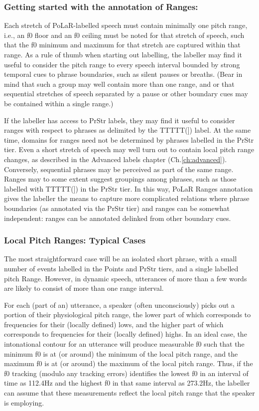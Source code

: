 \documentclass[11pt, twoside]{memoir}
\begin{document}
\subsubsection{Getting started with the annotation of Ranges:}\label{sec:getting-started-with-the-annotation-of-ranges}

Each stretch of PoLaR-labelled speech must contain minimally one pitch range, i.e., an f0 floor and an f0 ceiling must be noted for that stretch of speech, such that the f0 minimum and maximum for that stretch are captured within that range. As a rule of thumb when starting out labelling, the labeller may find it useful to consider the pitch range to every speech interval bounded by strong temporal cues to phrase boundaries, such as silent pauses or breaths. (Bear in mind that such a group may well contain more than one range, and or that sequential stretches of speech separated by a pause or other boundary cues may be contained within a single range.)

If the labeller has access to PrStr labels, they may find it useful to consider ranges with respect to phrases as delimited by the TTTTT(]) label. At the same time, domains for ranges need not be determined by phrases labelled in the PrStr tier. Even a short stretch of speech may well turn out to contain local pitch range changes, as described in the Advanced labels chapter (Ch.\ref{ch:advanced}). Conversely, sequential phrases may be perceived as part of the same range. Ranges may to some extent suggest groupings among phrases, such as those labelled with TTTTT(]) in the PrStr tier. In this way, PoLaR Ranges annotation gives the labeller the means to capture more complicated relations where phrase boundaries (as annotated via the PrStr tier) and ranges can be somewhat independent: ranges can be annotated delinked from other boundary cues.

\subsubsection{Local Pitch Ranges: Typical Cases}\label{sec:local-pitch-ranges-typical-cases}

The most straightforward case will be an isolated short phrase, with a small number of events labelled in the Points and PrStr tiers, and a single labelled pitch Range. However, in dynamic speech, utterances of more than a few words are likely to consist of more than one range interval.

For each (part of an) utterance, a speaker (often unconsciously) picks out a portion of their physiological pitch range, the lower part of which corresponds to frequencies for their (locally defined) lows, and the higher part of which corresponds to frequencies for their (locally defined) highs. In an ideal case, the intonational contour for an utterance will produce measurable f0 such that the minimum f0 is at (or around) the minimum of the local pitch range, and the maximum f0 is at (or around) the maximum of the local pitch range. Thus, if the f0 tracking (modulo any tracking errors) identifies the lowest f0 in an interval of time as 112.4Hz and the highest f0 in that same interval as 273.2Hz, the labeller can assume that these measurements reflect the local pitch range that the speaker is employing.
\end{document}
